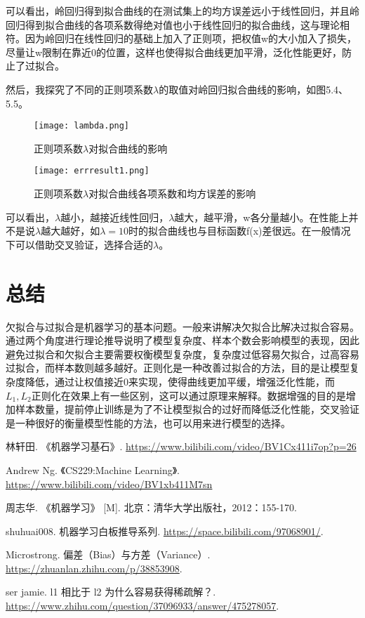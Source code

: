 \documentclass[forprint]{report}
\begin{document}
可以看出，岭回归得到拟合曲线的在测试集上的均方误差远小于线性回归，并且岭回归得到拟合曲线的各项系数得绝对值也小于线性回归的拟合曲线，这与理论相符。因为岭回归在线性回归的基础上加入了正则项，把权值w的大小加入了损失，尽量让w限制在靠近0的位置，这样也使得拟合曲线更加平滑，泛化性能更好，防止了过拟合。

然后，我探究了不同的正则项系数$\lambda$的取值对岭回归拟合曲线的影响，如图5.4、5.5。
\begin{figure}[ht]
	\centering
	\texttt{[image: lambda.png]}
	\caption{正则项系数$\lambda$对拟合曲线的影响}
	\label{fig:1}
\end{figure}
\begin{figure}[ht]
	\centering
	\texttt{[image: errresult1.png]}
	\caption{正则项系数$\lambda$对拟合曲线各项系数和均方误差的影响}
	\label{fig:1}
\end{figure}

可以看出，$\lambda$越小，越接近线性回归，$\lambda$越大，越平滑，w各分量越小。在性能上并不是说$\lambda$越大越好，如$\lambda=10$时的拟合曲线也与目标函数f(x)差很远。在一般情况下可以借助交叉验证，选择合适的$\lambda$。
\chapter{总结}
欠拟合与过拟合是机器学习的基本问题。一般来讲解决欠拟合比解决过拟合容易。通过两个角度进行理论推导说明了模型复杂度、样本个数会影响模型的表现，因此避免过拟合和欠拟合主要需要权衡模型复杂度，复杂度过低容易欠拟合，过高容易过拟合，而样本数则越多越好。正则化是一种改善过拟合的方法，目的是让模型复杂度降低，通过让权值接近0来实现，使得曲线更加平缓，增强泛化性能，而$L_1,L_2$正则化在效果上有一些区别，这可以通过原理来解释。数据增强的目的是增加样本数量，提前停止训练是为了不让模型拟合的过好而降低泛化性能，交叉验证是一种很好的衡量模型性能的方法，也可以用来进行模型的选择。

\cleardoublepage{}
{}
\renewcommand{\baselinestretch}{1.6}
\begin{thebibliography}{00}

   林轩田. 《机器学习基石》. \url{https://www.bilibili.com/video/BV1Cx411i7op?p=26}
  
   Andrew Ng. 《CS229:Machine Learning》. \url{https://www.bilibili.com/video/BV1xb411M7sn}
  
   周志华. 《机器学习》 [M]. 北京：清华大学出版社，2012：155-170.

   shuhuai008. 机器学习白板推导系列. \url{https://space.bilibili.com/97068901/}.
  
   Microstrong. 偏差（Bias）与方差（Variance）. \url{https://zhuanlan.zhihu.com/p/38853908}.
  
   ser jamie. l1 相比于 l2 为什么容易获得稀疏解？. \url{https://www.zhihu.com/question/37096933/answer/475278057}.
  

\end{thebibliography}

\cleardoublepage
\end{document}
